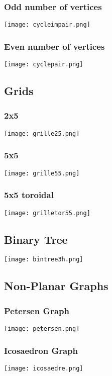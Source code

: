 \subsubsection{Odd number of vertices}

\texttt{[image: cycleimpair.png]}

\subsubsection{Even number of vertices}

\texttt{[image: cyclepair.png]}

\subsection{Grids}

\subsubsection{2x5}

\texttt{[image: grille25.png]}

\subsubsection{5x5}

\texttt{[image: grille55.png]}

\subsubsection{5x5 toroidal}

\texttt{[image: grilletor55.png]}

\subsection{Binary Tree}

\texttt{[image: bintree3h.png]}

\subsection{Non-Planar Graphs}

\subsubsection{Petersen Graph}

\texttt{[image: petersen.png]}

\subsubsection{Icosaedron Graph}

\texttt{[image: icosaedre.png]}